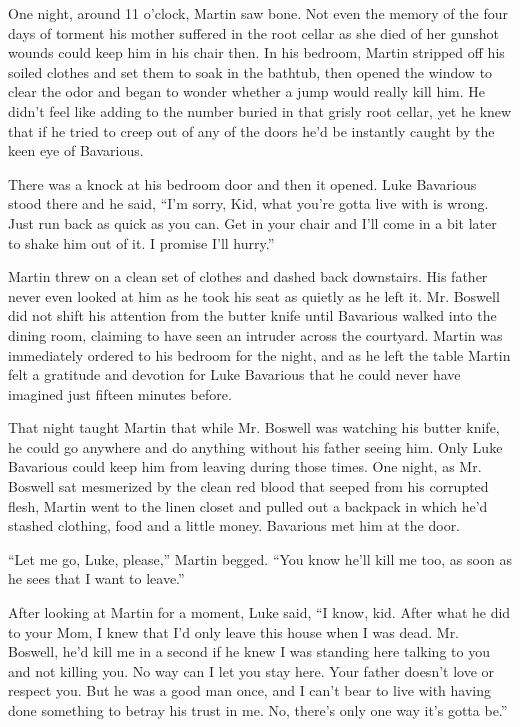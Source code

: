 One night, around 11 o'clock, Martin saw bone. Not even the memory
of the four days of torment his mother suffered in the root cellar
as she died of her gunshot wounds could keep him in his chair then.
In his bedroom, Martin stripped off his soiled clothes and set them
to soak in the bathtub, then opened the window to clear the odor
and began to wonder whether a jump would really kill him. He didn't
feel like adding to the number buried in that grisly root cellar,
yet he knew that if he tried to creep out of any of the doors he'd
be instantly caught by the keen eye of Bavarious.



There was a knock at his bedroom door and then it opened. Luke
Bavarious stood there and he said, ``I'm sorry, Kid, what you're
gotta live with is wrong. Just run back as quick as you can. Get in
your chair and I'll come in a bit later to shake him out of it. I
promise I'll hurry.''



Martin threw on a clean set of clothes and dashed back downstairs.
His father never even looked at him as he took his seat as quietly
as he left it. Mr. Boswell did not shift his attention from the
butter knife until Bavarious walked into the dining room, claiming
to have seen an intruder across the courtyard. Martin was
immediately ordered to his bedroom for the night, and as he left
the table Martin felt a gratitude and devotion for Luke Bavarious
that he could never have imagined just fifteen minutes
before.



That night taught Martin that while Mr. Boswell was watching his
butter knife, he could go anywhere and do anything without his
father seeing him. Only Luke Bavarious could keep him from leaving
during those times. One night, as Mr. Boswell sat mesmerized by the
clean red blood that seeped from his corrupted flesh, Martin went
to the linen closet and pulled out a backpack in which he'd stashed
clothing, food and a little money. Bavarious met him at the
door.



``Let me go, Luke, please,'' Martin begged. ``You know he'll kill me
too, as soon as he sees that I want to leave.''



After looking at Martin for a moment, Luke said, ``I know, kid.
After what he did to your Mom, I knew that I'd only leave this
house when I was dead. Mr. Boswell, he'd kill me in a second if he
knew I was standing here talking to you and not killing you. No way
can I let you stay here. Your father doesn't love or respect you.
But he was a good man once, and I can't bear to live with having
done something to betray his trust in me. No, there's only one way
it's gotta be.''



